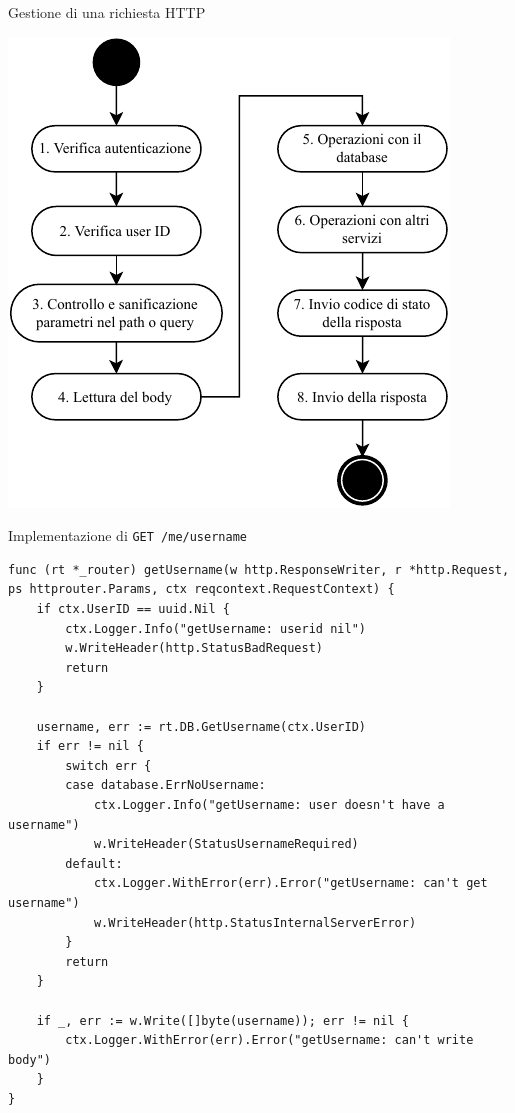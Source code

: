 \documentclass[compress]{beamer}
\begin{document}
\begin{frame}[c]{Gestione di una richiesta HTTP}
\begin{center}
\includegraphics[scale=0.85]{assets/04/operazioni-api.pdf}
\end{center}
\end{frame}

\begin{frame}[fragile,c]{Implementazione di \texttt{GET /me/username}}
\begin{verbatim}
func (rt *_router) getUsername(w http.ResponseWriter, r *http.Request, ps httprouter.Params, ctx reqcontext.RequestContext) {
	if ctx.UserID == uuid.Nil {
		ctx.Logger.Info("getUsername: userid nil")
		w.WriteHeader(http.StatusBadRequest)
		return
	}

	username, err := rt.DB.GetUsername(ctx.UserID)
	if err != nil {
		switch err {
		case database.ErrNoUsername:
			ctx.Logger.Info("getUsername: user doesn't have a username")
			w.WriteHeader(StatusUsernameRequired)
		default:
			ctx.Logger.WithError(err).Error("getUsername: can't get username")
			w.WriteHeader(http.StatusInternalServerError)
		}
		return
	}

	if _, err := w.Write([]byte(username)); err != nil {
		ctx.Logger.WithError(err).Error("getUsername: can't write body")
	}
}
\end{verbatim}
\end{frame}
\end{document}
